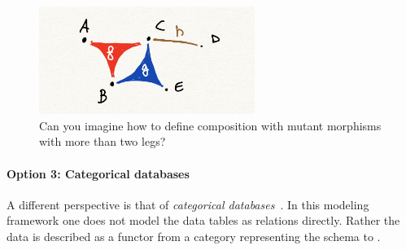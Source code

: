 \begin{figure}[h]
\centering
\includegraphics[width=7cm]{chapters/mutants.jpg}
\caption{Can you imagine how to define
composition with mutant morphisms
with more than two legs?}
\end{figure}

\paragraph{Option 3: Categorical databases}

A different perspective is that of \emph{categorical databases}~\cite{spivak2019categorical}. In this modeling framework
one does not model the data tables as relations directly.
Rather the data is described as a functor
from a category representing the schema
to \Set.
